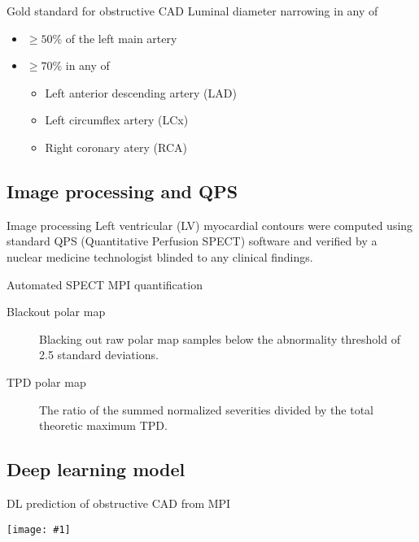 \documentclass{beamer}
\newcommand*{\solo}[1]{\texttt{[image: \#1]}}
\begin{document}
\begin{frame}{Gold standard for obstructive CAD}
    Luminal diameter narrowing in any of
    \begin{itemize}
        \item $\ge 50\%$ of the left main artery
        \item $\ge 70\%$ in any of
            \begin{itemize}
                \item Left anterior descending artery (LAD)
                \item Left circumflex artery (LCx)
                \item Right coronary atery (RCA)
            \end{itemize}
    \end{itemize}
\end{frame}

\subsection{Image processing and QPS}
\begin{frame}{Image processing}
    Left ventricular (LV) myocardial contours were computed using standard QPS
    (Quantitative Perfusion SPECT) software and verified by a nuclear medicine
    technologist blinded to any clinical findings.
\end{frame}

\begin{frame}{Automated SPECT MPI quantification}
    \begin{description}
        \item[Blackout polar map]
            Blacking out raw polar map samples below the abnormality threshold
            of 2.5 standard deviations.
        \item[TPD polar map]
            The ratio of the summed normalized severities divided by the total
            theoretic maximum TPD.
    \end{description}
\end{frame}

\subsection{Deep learning model}
\begin{frame}{DL prediction of obstructive CAD from MPI}
    \begin{center}
        \solo{1.eps}
    \end{center}
\end{frame}
\end{document}
